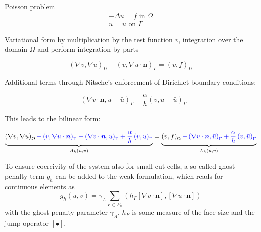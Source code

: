 \documentclass[A4]{scrartcl}
\title{}
\author{}
\begin{document}
%

Poisson problem
\begin{align}
	- \Delta u = f \text{ in } \Omega \\
	u = \bar{u} \text{ on } \Gamma
\end{align}

Variational form by multiplication by the test function $v$, integration over the domain $\Omega$ and perform integration by parts

\begin{equation}
	\left(\nabla v,\nabla  u\right)_\Omega - \left(v, \nabla u \cdot \boldsymbol{n} \right)_{\Gamma} = \left(v, f\right)_\Omega
\end{equation}


Additional terms through Nitsche's enforcement of Dirichlet boundary conditions:

\begin{equation}
	- \left(\nabla v\cdot \boldsymbol{n}, u - \bar{u} \right)_{\Gamma} + \frac{\alpha}{h} \left(v, u - \bar{u} \right)_{\Gamma}
\end{equation}

This leads to the bilinear form:

\begin{equation}
	\underbrace{
	\left(\nabla v,\nabla  u\right)_\Omega
	\textcolor{blue}{ - \left(v, \nabla u \cdot \boldsymbol{n} \right)_{\Gamma} -\left(\nabla v\cdot \boldsymbol{n}, u \right)_{\Gamma} + \frac{\alpha}{h} \left(v, u \right)_{\Gamma}}}_{A_h(u,v)} = \underbrace{\left(v, f\right)_\Omega 
	\textcolor{blue}{-\left(\nabla v\cdot \boldsymbol{n}, \bar{u} \right)_{\Gamma} + \frac{\alpha}{h} \left(v, \bar{u} \right)_{\Gamma}}}_{L_h(u,v)}
\end{equation}

To ensure coercivity of the system also for small cut cells, a so-called ghost penalty term $g_h$ can be added to the weak formulation, which reads for continuous elements as
\begin{equation}
	g_h(u,v) = \gamma_A \sum_{F\in F_h} (h_F [\nabla v \cdot \boldsymbol{n}], [\nabla u \cdot \boldsymbol{n}])
\end{equation}
with the ghost penalty parameter $\gamma_A$, $h_F$ is some measure of the face size and the jump operator $[\bullet]$.
\end{document}
